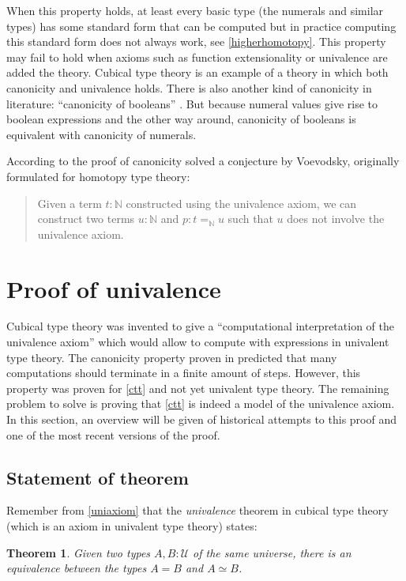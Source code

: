 \documentclass[12pt,a4paper,twoside,xetex]{book}
\newcommand{\keyword}[1]{\emph{#1}\index{#1}}
\newtheorem{theorem}{Theorem}[section]
\begin{document}
When this property holds, at least every basic type (the numerals and similar types) has some standard form that can be computed but in practice computing this standard form does not always work, see \cref{higherhomotopy}. This property may fail to hold when axioms such as function extensionality or univalence are added the theory. Cubical type theory is an example of a theory in which both canonicity and univalence holds. There is also another kind of canonicity in literature: ``canonicity of booleans'' \cite{Angiuli2018}. But because numeral values give rise to boolean expressions and the other way around, canonicity of booleans is equivalent with canonicity of numerals.

According to \cite{Brunerie2018} the proof of canonicity solved a conjecture by Voevodsky, originally formulated for homotopy type theory:

\begin{quotation}
Given a term $t: \mathbb{N}$ constructed using the univalence axiom, we can construct two terms $u : \mathbb{N}$ and $p : t =_{\mathbb{N}} u$ such that $u$ does not involve the univalence axiom.
\end{quotation}

\section{Proof of univalence}\label{univalenceproof}

Cubical type theory was invented to give a ``computational interpretation of the univalence axiom'' which would allow to compute with expressions in univalent type theory. The canonicity property proven in \cite{Brunerie2018} predicted that many computations should terminate in a finite amount of steps. However, this property was proven for \cref{ctt} and not yet univalent type theory. The remaining problem to solve is proving that \cref{ctt} is indeed a model of the univalence axiom. In this section, an overview will be given of historical attempts to this proof and one of the most recent versions of the proof.


\subsection{Statement of theorem}

Remember from \cref{uniaxiom} that the \keyword{univalence} theorem in cubical type theory (which is an axiom in univalent type theory) states:

\begin{theorem}
 Given two types $A, B : \mathcal{U}$ of the same universe, there is an equivalence between the types $A = B$ and $A \simeq B$.
 \end{theorem}
\end{document}
